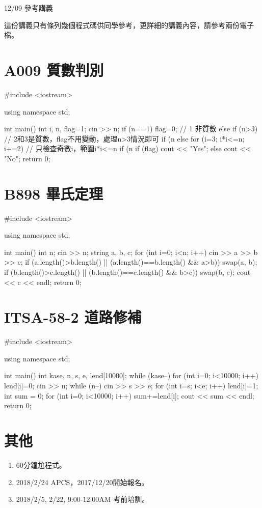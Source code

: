\documentclass[12pt,a4paper]{article}
\begin{document}
\centerline{\LARGE 12/09 參考講義}
\vspace{0.7cm}
這份講義只有條列幾個程式碼供同學參考，更詳細的講義內容，請參考兩份電子檔。

\section{A009 質數判別}
\begin{cppcode}
	#include <iostream>
	
	using namespace std;
	
	int main()
	{
		int i, n, flag=1;
		cin >> n;
		if (n==1) flag=0; // 1 非質數
		else if (n>3) { // 2和3是質數，flag不用變動，處理n>3情況即可
			if (n%
			else for (i=3; i*i<=n; i+=2) { // 只檢查奇數i，範圍i*i<=n
				if (n%
			}
		}
		if (flag) cout << "Yes";
		else cout << "No";
		return 0;
	}
\end{cppcode}

\section{B898 畢氏定理}	
\begin{cppcode}
#include <iostream>

using namespace std;

int main()
{
	int n; cin >> n;
	string a, b, c;
	for (int i=0; i<n; i++) {
		cin >> a >> b >> c;
		if (a.length()>b.length() || (a.length()==b.length() && a>b)) swap(a, b);
		if (b.length()>c.length() || (b.length()==c.length() && b>c)) swap(b, c);
		cout << c << endl;
	}
	return 0;
}
\end{cppcode}	


\section{ITSA-58-2 道路修補}
\begin{cppcode}
	#include <iostream>
	
	using namespace std;
	
	int main()
	{
		int kase, n, s, e, lend[10000];
		while (kase--) {
			for (int i=0; i<10000; i++) lend[i]=0;
			cin >> n;
			while (n--) {
				cin >> s >> e;
				for (int i=s; i<e; i++) lend[i]=1;
			}
			int sum = 0;
			for (int i=0; i<10000; i++) sum+=lend[i];
			cout << sum << endl;
		}
		return 0;
	}	
\end{cppcode}

\section{其他}
	
\begin{enumerate}
	\item 60分鐘尬程式。
	\item 2018/2/24 APCS，2017/12/20開始報名。
	\item 2018/2/5, 2/22, 9:00-12:00AM 考前培訓。
\end{enumerate}
\end{document}
